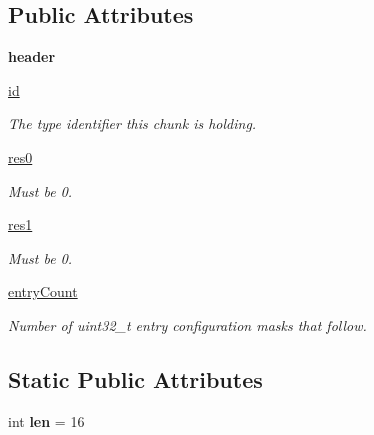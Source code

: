\subsection*{Public Attributes}
\begin{DoxyCompactItemize}
\item 
\mbox{\label{classtype_1_1ResTable__typeSpec__header_a30345bdfd899b767f323c33bff23aacf}} 
{\bfseries header}
\item 
\mbox{\hyperlink{classtype_1_1ResTable__typeSpec__header_aad59ee5d1b955fa94928d17fd38ce69e}{id}}
\begin{DoxyCompactList}\small\item\em The type identifier this chunk is holding. \end{DoxyCompactList}\item 
\mbox{\hyperlink{classtype_1_1ResTable__typeSpec__header_a3e65b1cd226cc73ec5d8f06bf3436834}{res0}}
\begin{DoxyCompactList}\small\item\em Must be 0. \end{DoxyCompactList}\item 
\mbox{\hyperlink{classtype_1_1ResTable__typeSpec__header_a7242e42ab27ef430881ca79ac8dac663}{res1}}
\begin{DoxyCompactList}\small\item\em Must be 0. \end{DoxyCompactList}\item 
\mbox{\hyperlink{classtype_1_1ResTable__typeSpec__header_ac508f83ab6f145fe79f7f527b8924567}{entry\+Count}}
\begin{DoxyCompactList}\small\item\em Number of uint32\+\_\+t entry configuration masks that follow. \end{DoxyCompactList}\end{DoxyCompactItemize}
\subsection*{Static Public Attributes}
\begin{DoxyCompactItemize}
\item 
\mbox{\label{classtype_1_1ResTable__typeSpec__header_afd71f9236b3dfda41b9b4883efb515fd}} 
int {\bfseries len} = 16
\end{DoxyCompactItemize}


